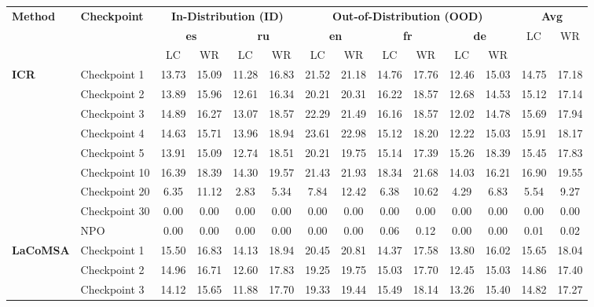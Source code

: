\begin{table}[t]
\centering
\scriptsize
\setlength{\tabcolsep}{4pt}
\renewcommand{\arraystretch}{1.15}
\begin{tabular}{ll|cc|cc|cc|cc|cc|cc}
\toprule
\multirow{2}{*}{\textbf{Method}} & \multirow{2}{*}{\textbf{Checkpoint}} & \multicolumn{4}{c|}{\textbf{In-Distribution (ID)}} & \multicolumn{6}{c|}{\textbf{Out-of-Distribution (OOD)}} & \multicolumn{2}{c}{\textbf{Avg}} \\
 &  & \multicolumn{2}{c}{\textbf{es}} & \multicolumn{2}{c|}{\textbf{ru}} & \multicolumn{2}{c}{\textbf{en}} & \multicolumn{2}{c}{\textbf{fr}} & \multicolumn{2}{c|}{\textbf{de}} & LC & WR \\
 &  & LC & WR & LC & WR & LC & WR & LC & WR & LC & WR &  &  \\
\midrule
\multirow{9}{*}{\textbf{ICR}} & Checkpoint 1  & 13.73 & 15.09 & 11.28 & 16.83 & 21.52 & 21.18 & 14.76 & 17.76 & 12.46 & 15.03 & 14.75 & 17.18 \\
 & Checkpoint 2  & 13.89 & 15.96 & 12.61 & 16.34 & 20.21 & 20.31 & 16.22 & 18.57 & 12.68 & 14.53 & 15.12 & 17.14 \\
 & Checkpoint 3  & 14.89 & 16.27 & 13.07 & 18.57 & 22.29 & 21.49 & 16.16 & 18.57 & 12.02 & 14.78 & 15.69 & 17.94 \\
 & Checkpoint 4  & 14.63 & 15.71 & 13.96 & 18.94 & 23.61 & 22.98 & 15.12 & 18.20 & 12.22 & 15.03 & 15.91 & 18.17 \\
 & Checkpoint 5  & 13.91 & 15.09 & 12.74 & 18.51 & 20.21 & 19.75 & 15.14 & 17.39 & 15.26 & 18.39 & 15.45 & 17.83 \\
 & Checkpoint 10 & 16.39 & 18.39 & 14.30 & 19.57 & 21.43 & 21.93 & 18.34 & 21.68 & 14.03 & 16.21 & 16.90 & 19.55 \\
 & Checkpoint 20 & 6.35 & 11.12 & 2.83 & 5.34 & 7.84 & 12.42 & 6.38 & 10.62 & 4.29 & 6.83 & 5.54 & 9.27 \\
 & Checkpoint 30 & 0.00 & 0.00 & 0.00 & 0.00 & 0.00 & 0.00 & 0.00 & 0.00 & 0.00 & 0.00 & 0.00 & 0.00 \\
 & NPO           & 0.00 & 0.00 & 0.00 & 0.00 & 0.00 & 0.00 & 0.06 & 0.12 & 0.00 & 0.00 & 0.01 & 0.02 \\
\midrule
\multirow{9}{*}{\textbf{LaCoMSA}} & Checkpoint 1  & 15.50 & 16.83 & 14.13 & 18.94 & 20.45 & 20.81 & 14.37 & 17.58 & 13.80 & 16.02 & 15.65 & 18.04 \\
 & Checkpoint 2  & 14.96 & 16.71 & 12.60 & 17.83 & 19.25 & 19.75 & 15.03 & 17.70 & 12.45 & 15.03 & 14.86 & 17.40 \\
 & Checkpoint 3  & 14.12 & 15.65 & 11.88 & 17.70 & 19.33 & 19.44 & 15.49 & 18.14 & 13.26 & 15.40 & 14.82 & 17.27 \\

\end{tabular}
\end{table}
